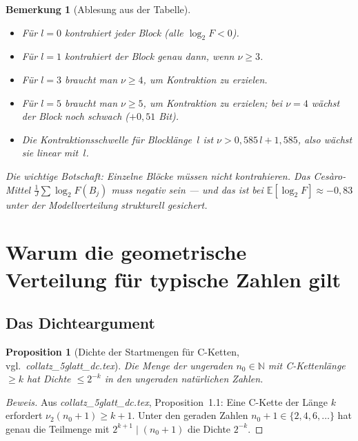 \documentclass[12pt,a4paper]{article}
\newtheorem{proposition}[definition]{Proposition}
\newtheorem{bemerkung}[definition]{Bemerkung}
\newenvironment{beweis}{\begin{proof}[Beweis]}{\end{proof}}
\newcommand{\vii}{\nu_2}
\newcommand{\N}{\mathbb{N}}
\newcommand{\E}{\mathbb{E}}
\newcommand{\logt}{\log_2}        %
\begin{document}
\begin{bemerkung}[Ablesung aus der Tabelle]
\begin{itemize}[leftmargin=*]
  \item Für $l = 0$ kontrahiert jeder Block (alle $\logt F < 0$).
  \item Für $l = 1$ kontrahiert der Block genau dann, wenn $\nu \geq 3$.
  \item Für $l = 3$ braucht man $\nu \geq 4$, um Kontraktion zu erzielen.
  \item Für $l = 5$ braucht man $\nu \geq 5$, um Kontraktion zu erzielen;
    bei $\nu = 4$ wächst der Block noch schwach ($+0{,}51$ Bit).
  \item Die Kontraktionsschwelle für Blocklänge~$l$ ist
    $\nu > 0{,}585\,l + 1{,}585$, also wächst sie linear mit~$l$.
\end{itemize}
Die wichtige Botschaft: Einzelne Blöcke \emph{müssen nicht} kontrahieren.
Das Cesàro-Mittel $\frac{1}{J}\sum \logt F(B_j)$ muss negativ sein ---
und das ist bei $\E[\logt F] \approx -0{,}83$ unter der Modellverteilung
strukturell gesichert.
\end{bemerkung}

\section{Warum die geometrische Verteilung für typische Zahlen gilt}
\label{sec:typisch}

\subsection{Das Dichteargument}

\begin{proposition}[Dichte der Startmengen für C-Ketten, vgl.\ \textit{collatz\_5glatt\_dc.tex}]
\label{prop:dichte}
Die Menge der ungeraden $n_0 \in \N$ mit C-Kettenlänge $\geq k$ hat
Dichte $\leq 2^{-k}$ in den ungeraden natürlichen Zahlen.
\end{proposition}

\begin{beweis}
Aus \textit{collatz\_5glatt\_dc.tex}, Proposition~1.1: Eine C-Kette der
Länge $k$ erfordert $\vii(n_0+1) \geq k+1$. Unter den geraden Zahlen
$n_0+1 \in \{2,4,6,\ldots\}$ hat genau die Teilmenge mit $2^{k+1} \mid (n_0+1)$
die Dichte $2^{-k}$. \qedhere
\end{beweis}
\end{document}
